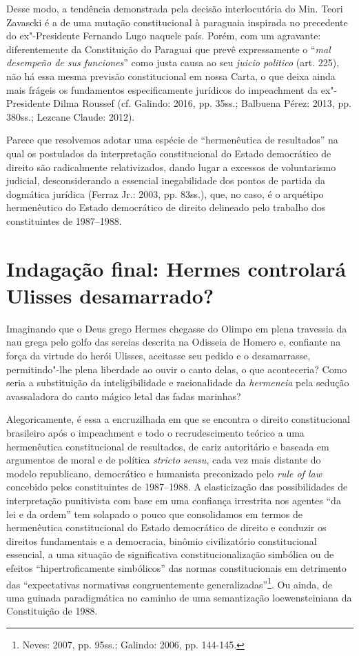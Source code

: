 Desse modo, a tendência demonstrada pela decisão interlocutória do Min.
Teori Zavascki é a de uma mutação constitucional à paraguaia inspirada
no precedente do ex"-Presidente Fernando Lugo naquele país. Porém, com um
agravante: diferentemente da Constituição do Paraguai que prevê
expressamente o ``\emph{mal desempeño de sus funciones}'' como justa
causa ao seu \emph{juicio politico} (art. 225), não há essa mesma
previsão constitucional em nossa Carta, o que deixa ainda mais frágeis
os fundamentos especificamente jurídicos do impeachment da
ex"-Presidente Dilma Roussef (cf. Galindo: 2016, pp. 35ss.; Balbuena
Pérez: 2013, pp. 380ss.; Lezcane Claude: 2012).

Parece que resolvemos adotar uma espécie de ``hermenêutica de
resultados'' na qual os postulados da interpretação constitucional do
Estado democrático de direito são radicalmente relativizados, dando
lugar a excessos de voluntarismo judicial, desconsiderando a essencial
inegabilidade dos pontos de partida da dogmática jurídica (Ferraz Jr.:
2003, pp. 83ss.), que, no caso, é o arquétipo hermenêutico do Estado
democrático de direito delineado pelo trabalho dos constituintes de
1987--1988.

\section{Indagação final: Hermes controlará Ulisses desamarrado?}

Imaginando que o Deus grego Hermes chegasse do Olimpo em plena travessia
da nau grega pelo golfo das sereias descrita na Odisseia de Homero e,
confiante na força da virtude do herói Ulisses, aceitasse seu pedido e o
desamarrasse, permitindo"-lhe plena liberdade ao ouvir o canto delas, o
que aconteceria? Como seria a substituição da inteligibilidade e
racionalidade da \emph{hermeneia} pela sedução avassaladora do canto
mágico letal das fadas marinhas?

Alegoricamente, é essa a encruzilhada em que se encontra o direito
constitucional brasileiro após o impeachment e todo o
recrudescimento teórico a uma hermenêutica constitucional de resultados,
de cariz autoritário e baseada em argumentos de moral e de política
\emph{stricto sensu}, cada vez mais distante do modelo republicano,
democrático e humanista preconizado pelo \emph{rule of law} concebido
pelos constituintes de 1987--1988. A elasticização das possibilidades de
interpretação punitivista com base em uma confiança irrestrita nos
agentes ``da lei e da ordem'' tem solapado o pouco que consolidamos em
termos de hermenêutica constitucional do Estado democrático de direito e
conduzir os direitos fundamentais e a democracia, binômio civilizatório
constitucional essencial, a uma situação de significativa
constitucionalização simbólica ou de efeitos ``hipertroficamente
simbólicos'' das normas constitucionais em detrimento das ``expectativas
normativas congruentemente generalizadas''\footnote{Neves: 2007, pp. 95ss.;
Galindo: 2006, pp. 144-145.}. Ou ainda, de uma guinada paradigmática no
caminho de uma semantização loewensteiniana da Constituição de 1988.

